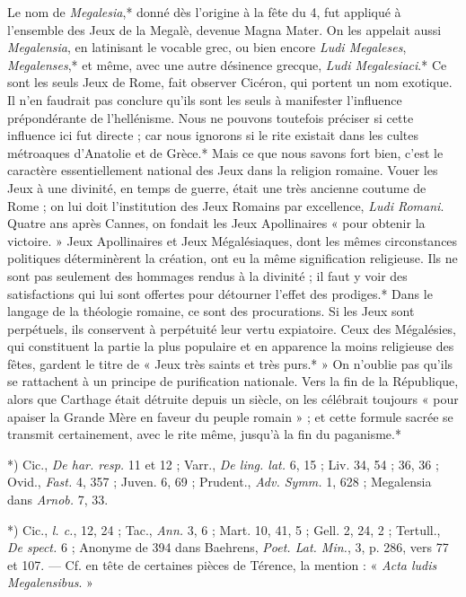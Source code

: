 \documentclass[a4paper, 11pt, oneside, polutonikogreek, french]{article}
\begin{document}
Le nom de \emph{Megalesia},* donné dès l'origine à la fête du 4, fut appliqué à l'ensemble des Jeux de la Megalè, devenue Magna Mater. On les appelait aussi \emph{Megalensia}, en latinisant le vocable grec, ou bien encore \emph{Ludi Megaleses}, \emph{Megalenses},* et même, avec une autre désinence grecque, \emph{Ludi Megalesiaci}.* Ce sont les seuls Jeux de Rome, fait observer Cicéron, qui portent un nom exotique. Il n'en faudrait pas conclure qu'ils sont les seuls à manifester l'influence prépondérante de l'hellénisme. Nous ne pouvons toutefois préciser si cette influence ici fut directe ; car nous ignorons si le rite existait dans les cultes métroaques d'Anatolie et de Grèce.* Mais ce que nous savons fort bien, c'est le caractère essentiellement national des Jeux dans la religion romaine. Vouer les Jeux à une divinité, en temps de guerre, était une très ancienne coutume de Rome ; on lui doit l'institution des Jeux Romains par excellence, \emph{Ludi Romani}. Quatre ans après Cannes, on fondait les Jeux Apollinaires « pour obtenir la victoire. » Jeux Apollinaires et Jeux Mégalésiaques, dont les mêmes circonstances politiques déterminèrent la création, ont eu la même signification religieuse. Ils ne sont pas seulement des hommages rendus à la divinité ; il faut y voir des satisfactions qui lui sont offertes pour détourner l'effet des prodiges.* Dans le langage de la théologie romaine, ce sont des procurations. Si les Jeux sont perpétuels, ils conservent à perpétuité leur vertu expiatoire. Ceux des Mégalésies, qui constituent la partie la plus populaire et en apparence la moins religieuse des fêtes, gardent le titre de « Jeux très saints et très purs.* » On n'oublie pas qu'ils se rattachent à un principe de purification nationale. Vers la fin de la République, alors que Carthage était détruite depuis un siècle, on les célébrait toujours « pour apaiser la Grande Mère en faveur du peuple romain » ; et cette formule sacrée se transmit certainement, avec le rite même, jusqu'à la fin du paganisme.*

*) Cic., \emph{De har. resp.} 11 et 12 ; Varr., \emph{De ling. lat.} 6, 15 ; Liv. 34, 54 ; 36, 36 ; Ovid., \emph{Fast.} 4, 357 ; Juven. 6, 69 ; Prudent., \emph{Adv. Symm.} 1, 628 ; Megalensia dans \emph{Arnob.} 7, 33.

*) Cic., \emph{l. c.}, 12, 24 ; Tac., \emph{Ann.} 3, 6 ; Mart. 10, 41, 5 ; Gell. 2, 24, 2 ; Tertull., \emph{De spect.} 6 ; Anonyme de 394 dans Baehrens, \emph{Poet. Lat. Min.}, 3, p. 286, vers 77 et 107. --- Cf. en tête de certaines pièces de Térence, la mention : « \emph{Acta ludis Megalensibus}. »
\end{document}
